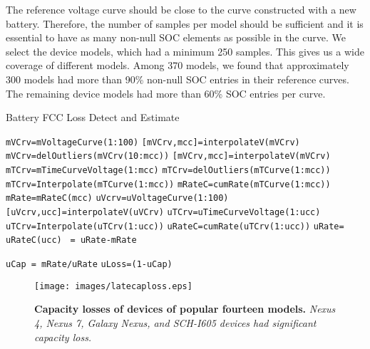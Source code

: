 \documentclass[journal]{IEEEtran}
\begin{document}
The reference voltage curve should be close to the curve constructed with a new battery. Therefore, the number of samples per model should be sufficient and it is essential to have as many non-null SOC elements as possible in the curve. We select the device models, which had a minimum 250 samples. This gives us a wide coverage of different models. Among 370 models, we found that approximately 300  models had more than 90\% non-null SOC entries in their reference curves. The remaining device models had more than 60\% SOC entries per curve.






\begin{algorithm}[t]
\caption{Battery FCC Loss Detect and Estimate}\label{alg:cevent}
\begin{algorithmic}[1]
    \State \texttt{mVCrv=mVoltageCurve(1:100)}
    \State \texttt{[mVCrv,mcc]=interpolateV(mVCrv)}
    \State \texttt{mVCrv=delOutliers(mVCrv(10:mcc))}
    \State \texttt{[mVCrv,mcc]=interpolateV(mVCrv)} 
    \State \texttt{mTCrv=mTimeCurveVoltage(1:mcc)}
\State \texttt{mTCrv=delOutliers(mTCurve(1:mcc))}
    \State \texttt{mTCrv=Interpolate(mTCurve(1:mcc))}
    \State \texttt{mRateC=cumRate(mTCurve(1:mcc))}
    \State \texttt{mRate=mRateC(mcc)}
        \State \texttt{uVcrv=uVoltageCurve(1:100)}
        \State \texttt{[uVcrv,ucc]=interpolateV(uVCrv)}
        \State \texttt{uTCrv=uTimeCurveVoltage(1:ucc)}
        \State \texttt{uTCrv=Interpolate(uTCrv(1:ucc))}
        \State \texttt{uRateC=cumRate(uTCrv(1:ucc))}
        \State \texttt{uRate= uRateC(ucc)}
        \State \texttt{ = uRate-mRate}

        \If{\texttt{()} \&\& }
\State \texttt {uCap = mRate/uRate}
            \State \texttt{uLoss=(1-uCap)}
        \EndIf
    \EndFor
\EndFor
\EndFunction
\end{algorithmic}
\end{algorithm}

\begin{figure*}[t]
  \begin{center}
  \texttt{[image: images/latecaploss.eps]}
    
\caption{{\bf Capacity losses of devices of popular fourteen models. }{\sl Nexus 4, Nexus 7, Galaxy Nexus, and SCH-I605 devices had significant capacity loss.}}

\label{fig:devloss}
 \end{center}
 \end{figure*}
\end{document}
